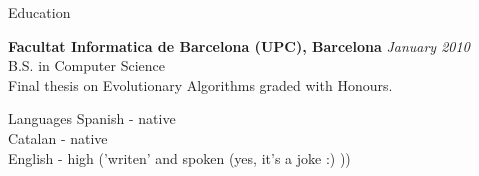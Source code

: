 \documentclass{resume} %
\begin{document}

\begin{rSection}{Education}

{\bf Facultat Informatica de Barcelona (UPC), Barcelona} \hfill {\em January 2010} \\
B.S. in Computer Science \\
Final thesis on Evolutionary Algorithms graded with Honours. \smallskip \\
\end{rSection}

\begin{rSection}{Languages}
Spanish - native\\
Catalan - native\\
English - high ('writen' and spoken (yes, it's a joke :) ))\\
\end{rSection}
\end{document}
